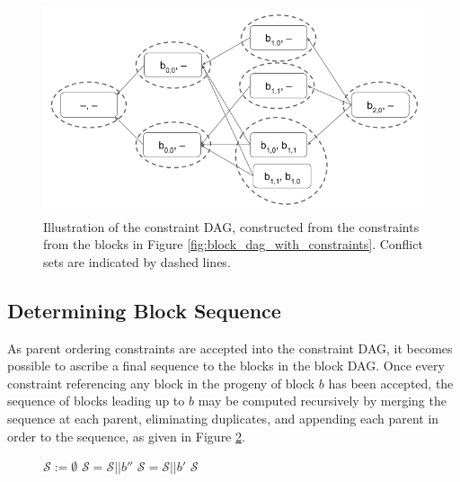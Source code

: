 \documentclass[12pt]{article}
\begin{document}
  \begin{figure}
    \centering
    \includegraphics[width=\columnwidth]{images/constraint_dag.png}
    \caption{Illustration of the constraint DAG, constructed from the
      constraints from the blocks in Figure
      \ref{fig:block_dag_with_constraints}. Conflict sets are indicated by
      dashed lines.
      }\label{fig:constraint_dag}
  \end{figure}

\subsection{Determining Block Sequence}
  As parent ordering constraints are accepted into the constraint DAG, it
  becomes possible to ascribe a final sequence to the blocks in the block DAG.
  Once every constraint referencing any block in the progeny of block $b$ has
  been accepted, the sequence of blocks leading up to $b$ may be computed
  recursively by merging the sequence at each parent, eliminating duplicates,
  and appending each parent in order to the sequence, as given in
  Figure \ref{alg:sequencing}.

  \begin{figure}
  \begin{center}
  \small
  \begin{algorithmic}[1]
        \State $\mathcal{S} := \emptyset$
            \State $\mathcal{S} = \mathcal{S} || b''$
          \EndFor
        \EndFor
            \State $\mathcal{S} = \mathcal{S} || b'$
        \EndFor
        \State \Return $\mathcal{S}$
      \EndProcedure
       \label{alg:sequencing}
  \end{algorithmic}
  \end{center}
  \end{figure}
\end{document}

